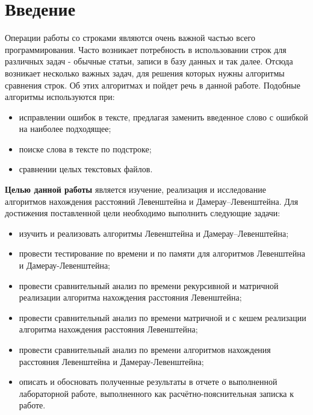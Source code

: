 \chapter*{Введение}

Операции работы со строками являются очень важной частью всего программирования. Часто возникает потребность в использовании строк для различных задач - обычные статьи, записи в базу данных и так далее. Отсюда возникает несколько важных задач, для решения которых нужны алгоритмы сравнения строк. Об этих алгоритмах и пойдет речь в данной работе. 
Подобные алгоритмы используются при:
\begin{itemize}
	\item исправлении ошибок в тексте, предлагая заменить введенное слово с ошибкой на наиболее подходящее;
    \item поиске слова в тексте по подстроке;
    \item сравнении целых текстовых файлов. \newline
\end{itemize}



\textbf{Целью данной работы} является изучение, реализация и исследование алгоритмов нахождения расстояний Левенштейна и Дамерау--Левенштейна. 
Для достижения поставленной цели необходимо выполнить следующие задачи:
\begin{itemize}
	\item изучить и реализовать алгоритмы Левенштейна и Дамерау--Левенштейна;
    \item провести тестирование по времени и по памяти для алгоритмов Левенштейна и Дамерау-Левенштейна;
    \item провести сравнительный анализ по времени рекурсивной и матричной реализации алгоритма нахождения расстояния Левенштейна;
    \item провести сравнительный анализ по времени матричной и с кешем реализации алгоритма нахождения расстояния Левенштейна;
    \item провести сравнительный анализ по времени алгоритмов нахождения расстояния Левенштейна и Дамерау-Левенштейна;
	\item описать и обосновать полученные результаты в отчете о выполненной лабораторной работе, выполненного как расчётно-пояснительная записка к работе.
\end{itemize}
